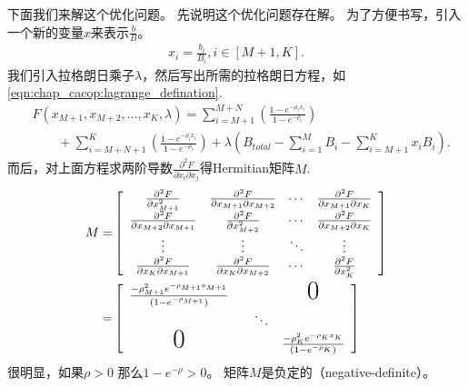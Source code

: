 下面我们来解这个优化问题。
先说明这个优化问题存在解。
为了方便书写，引入一个新的变量$x$来表示$\frac{b}{B}$。
\begin{equation*}
\begin{split}
x_i = \frac{b_i}{B_i} , i \in [M+1, K].
\end{split}
\end{equation*}
我们引入拉格朗日乘子$\lambda$，然后写出所需的拉格朗日方程，如
\eqref{eqn:chap_cacop:lagrange_defination}.
\begin{align}
&\displaystyle F(x_{M+1}, x_{M+2}, \dots, x_K, \lambda)= \sum^{M+N}_{i=M+1}
\left( \frac{1-e^{-\rho_i x_i}}{1-e^{-\rho_i}} \right) \nonumber \\
& \qquad \displaystyle +\sum_{i=M+N+1}^K\left( \frac{1-e^{-\rho_i x_i}}{1-e^{-\rho_i}} \right) 
 + \lambda
\left(B_{total} - \sum_{i=1}^M B_i -\sum^K_{i=M+1} x_i B_i \right).
\label{eqn:chap_cacop:lagrange_defination}
\end{align}
而后，对上面方程求两阶导数$\frac{\partial ^2F}{\partial x_i \partial x_j}$得Hermitian矩阵${M}$.
\begin{eqnarray*}
{M} = & 
\left[
\begin{array}{cccc}
\frac{\partial ^2F}{\partial x_{M+1} ^2} &\frac{\partial ^2F}{\partial x_{M+1} \partial x_{M+2}} & \dotsi & \frac{\partial ^2F}{\partial x_{M+1} \partial x_K} \\
\frac{\partial ^2F}{\partial x_{M+2} \partial x_{M+1}}& \frac{\partial ^2F}{\partial x_{M+2} ^2}& \dotsi & \frac{\partial ^2F}{\partial x_{M+2} \partial x_K}\\
\vdots & \vdots & \ddots & \vdots \\

\frac{\partial ^2F}{\partial x_{K} \partial x_{M+1} } &\frac{\partial ^2F}{\partial x_{K} \partial x_{M+2}} & \dotsi&\frac{\partial ^2F}{\partial x_K ^2}\\
\end{array}
\right] \\
=&
\left[
\begin{array}{cccc}
\frac{-\rho_{M+1}^2 e^{-\rho_{M+1} x_{M+1}}}{(1-e^{-\rho_{M+1}})} & & & \text{{\huge{0}}}\\
&&\ddots\\
\text{{\huge{0}}} &&& \frac{-\rho_{K}^2 e^{-\rho_{K} x_{K}}}{(1-e^{-\rho_{K}})}\\
\end{array}
\right] 
\end{eqnarray*}
很明显，如果$\rho >0$ 那么$1-e^{-\rho} >0$。
矩阵${M}$是负定的（negative-definite）。
